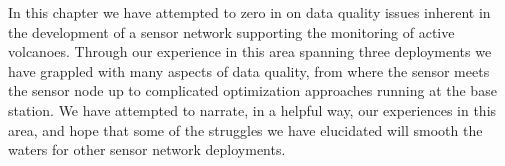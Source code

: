 In this chapter we have attempted to zero in on data quality issues inherent
in the development of a sensor network supporting the monitoring of active
volcanoes. Through our experience in this area spanning three deployments we
have grappled with many aspects of data quality, from where the sensor meets
the sensor node up to complicated optimization approaches running at the base
station.  We have attempted to narrate, in a helpful way, our experiences in
this area, and hope that some of the struggles we have elucidated will smooth
the waters for other sensor network deployments.
